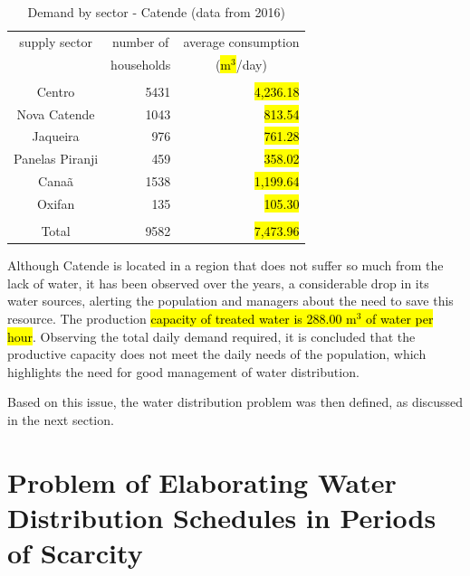 \documentclass{singlecol}
\theoremstyle{TH}{
\newtheorem{lemma}{Lemma}
\newtheorem{theorem}[lemma]{Theorem}
\newtheorem{corrolary}[lemma]{Corrolary}
\newtheorem{conjecture}[lemma]{Conjecture}
\newtheorem{proposition}[lemma]{Proposition}
\newtheorem{claim}[lemma]{Claim}
\newtheorem{stheorem}[lemma]{Wrong Theorem}
\newtheorem{algorithm}{Algorithm}
}
\theoremstyle{THrm}{
\newtheorem{definition}{Definition}[section]
\newtheorem{question}{Question}[section]
\newtheorem{remark}{Remark}
\newtheorem{scheme}{Scheme}
}
\theoremstyle{THhit}{
\newtheorem{case}{Case}[section]
}
\begin{document}
\begin{table}[H]
\begin{center}
	\begin{tabular}{ c  r  r } 
		supply sector       &  \multicolumn{1}{c}{number of}     &   \multicolumn{1}{c}{average consumption}  \\
		                    &  \multicolumn{1}{c}{households}    &  \multicolumn{1}{c}{(\hl{$\mathrm{m^3}$}/day)}   \\
		\\
		Centro              & 5431          &  \hl{4,236.18}  \\
		Nova Catende        & 1043 	   &    \hl{813.54}  \\
		Jaqueira            &  976          &    \hl{761.28} \\
		Panelas Piranji     &  459          &    \hl{358.02} \\
		Canaã               & 1538          &  \hl{1,199.64} \\
		Oxifan              &  135          &    \hl{105.30} \\
		\\
		Total               & 9582          &  \hl{7,473.96} \\
		\hline
	\end{tabular}
\caption{Demand by sector - Catende (data from 2016)}
\label{tab:SectorsCatende}
\end{center}
\end{table}

Although Catende is located in a region that does not suffer so much from the lack of water, it has been observed over the years, a considerable drop in its water sources, alerting the population and managers about the need to save this resource. The production \label{secondChange}{\hl{capacity of treated water is 288.00 $\mathrm{m^3}$ of water per hour}}. Observing the total daily demand required, it is concluded that the productive capacity does not meet the daily needs of the population, which highlights the need for good management of water distribution.

Based on this issue, the water distribution problem was then defined, as discussed in the next section. 

\section{Problem of Elaborating Water Distribution Schedules in Periods of Scarcity} 
\label{sec:EWDSPSP}
\end{document}
